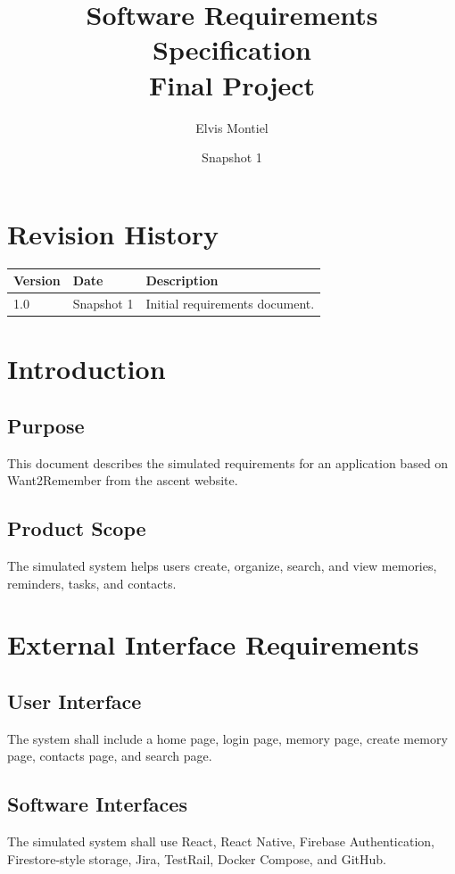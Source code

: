 \documentclass{article}
\title{Software Requirements Specification\\Final Project}
\author{Elvis Montiel}
\date{Snapshot 1}
\begin{document}
\maketitle
\tableofcontents
\newpage

\section{Revision History}
\begin{longtable}{|p{2cm}|p{3cm}|p{8cm}|}
\hline
Version & Date & Description \\ \hline
1.0 & Snapshot 1 & Initial requirements document. \\ \hline
\end{longtable}

\section{Introduction}
\subsection{Purpose}
This document describes the simulated requirements for an application based on Want2Remember from the ascent website.

\subsection{Product Scope}
The simulated system helps users create, organize, search, and view memories, reminders, tasks, and contacts.

\section{External Interface Requirements}
\subsection{User Interface}
The system shall include a home page, login page, memory page, create memory page, contacts page, and search page.

\subsection{Software Interfaces}
The simulated system shall use React, React Native, Firebase Authentication, Firestore-style storage, Jira, TestRail, Docker Compose, and GitHub.
\end{document}
